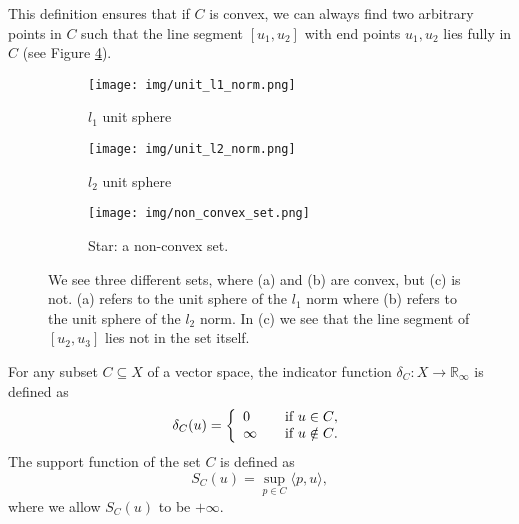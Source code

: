     This definition ensures that if $C$ is convex, we can always find two arbitrary points in $C$ such that the line segment $[u_{1}, u_{2}]$ with end points $u_{1}, u_{2}$ lies fully in $C$ (see Figure \ref{fig:convex_and_non_convex_sets}).
    \begin{figure}[ht]
        \centering
        \begin{subfigure}[b]{0.3\textwidth}
            \texttt{[image: img/unit\_l1\_norm.png]}
            \caption{$l_{1}$ unit sphere}
            \label{fig:unit_l2_norm}
        \end{subfigure}
        \begin{subfigure}[b]{0.3\textwidth}
            \texttt{[image: img/unit\_l2\_norm.png]}
            \caption{$l_{2}$ unit sphere}
            \label{fig:unit_l1_norm}
        \end{subfigure}
        \begin{subfigure}[b]{0.3\textwidth}
            \texttt{[image: img/non\_convex\_set.png]}
            \caption{Star: a non-convex set.}
            \label{fig:star}
        \end{subfigure}
        \caption{We see three different sets, where (a) and (b) are convex, but (c) is not. (a) refers to the unit sphere of the $l_{1}$ norm where (b) refers to the unit sphere of the $l_{2}$ norm. In (c) we see that the line segment of $[u_{2}, u_{3}]$ lies not in the set itself.}
        \label{fig:convex_and_non_convex_sets}
    \end{figure}

    \begin{definition} %
    \label{def:indicator_function}

        For any subset $C \subseteq X$ of a vector space, the indicator function $\delta_{C}: X \longrightarrow \mathbb{R}_{\infty}$ is defined as
            \begin{equation}
                \delta_{C}(u) =
                \left\{
                    \begin{array}{l l}
                      0      & \quad \text{if $u \in C$}, \\
                      \infty & \quad \text{if $u \notin C$}.
                    \end{array}
                \right.
            \label{eq:indicator_function}
            \end{equation}
        The support function of the set $C$ is defined as
            \begin{equation}
                S_{C}(u) = \sup_{p \in C} \langle p, u \rangle,
            \label{eq:support_function}
            \end{equation}
        where we allow $S_{C}(u)$ to be $+\infty$.

    \end{definition}

